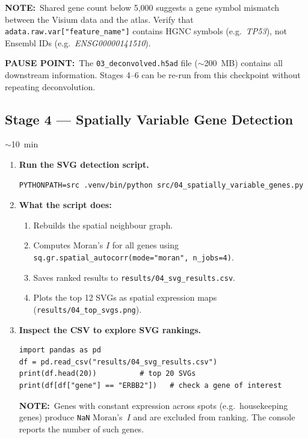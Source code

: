 \documentclass[12pt, a4paper]{article}
\newcommand{\notepar}[1]{\par\smallskip\noindent%
    {\bfseries NOTE:}\ #1\par\smallskip}
\newcommand{\pausept}[1]{\par\smallskip\noindent%
    {\bfseries PAUSE POINT:}\ #1\par\smallskip}
\newcommand{\timing}[1]{%
    \begin{tcolorbox}[colback=orange!7,colframe=orange!55!black,
        fonttitle=\bfseries\small,title=Timing,
        boxrule=0.5pt,left=4pt,right=4pt,top=2pt,bottom=2pt,
        before upper=\small]
    #1
    \end{tcolorbox}\vspace{2pt}}
\begin{document}
\begin{enumerate}
\notepar{Shared gene count below 5,000 suggests a gene symbol
mismatch between the Visium data and the atlas.  Verify that
\texttt{adata.raw.var["feature\_name"]} contains HGNC symbols
(e.g.\ \emph{TP53}), not Ensembl IDs (e.g.\ \emph{ENSG00000141510}).}

\pausept{The \texttt{03\_deconvolved.h5ad} file ($\sim$200~MB)
contains all downstream information.  Stages 4--6 can be
re-run from this checkpoint without repeating deconvolution.}

\end{enumerate}

\subsection{Stage 4 — Spatially Variable Gene Detection}

\timing{$\sim$10~min}

\begin{enumerate}

\item \textbf{Run the SVG detection script.}
\begin{lstlisting}
PYTHONPATH=src .venv/bin/python src/04_spatially_variable_genes.py
\end{lstlisting}

\item \textbf{What the script does:}
\begin{enumerate}
    \item Rebuilds the spatial neighbour graph.
    \item Computes Moran's $I$ for all genes using
          \texttt{sq.gr.spatial\_autocorr(mode="moran", n\_jobs=4)}.
    \item Saves ranked results to \texttt{results/04\_svg\_results.csv}.
    \item Plots the top 12 SVGs as spatial expression maps
          (\texttt{results/04\_top\_svgs.png}).
\end{enumerate}

\item \textbf{Inspect the CSV to explore SVG rankings.}
\begin{lstlisting}[style=python]
import pandas as pd
df = pd.read_csv("results/04_svg_results.csv")
print(df.head(20))          # top 20 SVGs
print(df[df["gene"] == "ERBB2"])   # check a gene of interest
\end{lstlisting}

\notepar{Genes with constant expression across spots (e.g.\ housekeeping
genes) produce \texttt{NaN} Moran's~$I$ and are excluded from ranking.
The console reports the number of such genes.}

\end{enumerate}
\end{document}
